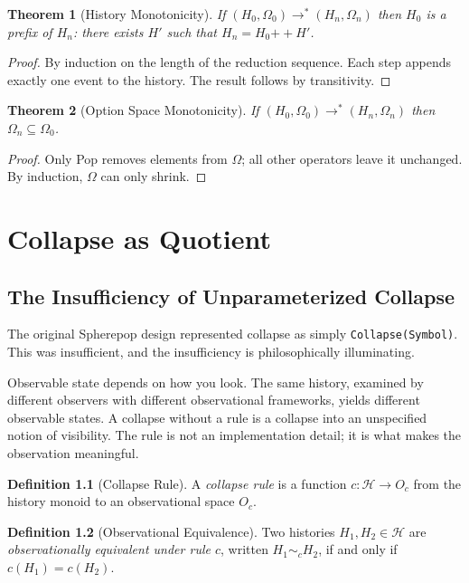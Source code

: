 \documentclass[12pt, a4paper, openany]{book}
\theoremstyle{plain}
\newtheorem{theorem}{Theorem}[chapter]
\theoremstyle{definition}
\newtheorem{definition}[theorem]{Definition}
\theoremstyle{remark}
\newcommand{\calH}{\mathcal{H}}
\begin{document}
\begin{theorem}[History Monotonicity]
If $(H_0, \Omega_0) \to^* (H_n, \Omega_n)$ then $H_0$ is a prefix of $H_n$:
there exists $H'$ such that $H_n = H_0 \mathbin{++} H'$.
\end{theorem}

\begin{proof}
By induction on the length of the reduction sequence. Each step appends exactly
one event to the history. The result follows by transitivity.
\end{proof}

\begin{theorem}[Option Space Monotonicity]
If $(H_0, \Omega_0) \to^* (H_n, \Omega_n)$ then $\Omega_n \subseteq \Omega_0$.
\end{theorem}

\begin{proof}
Only Pop removes elements from $\Omega$; all other operators leave it unchanged.
By induction, $\Omega$ can only shrink.
\end{proof}

\chapter{Collapse as Quotient}

\section{The Insufficiency of Unparameterized Collapse}

The original Spherepop design represented collapse as simply \texttt{Collapse(Symbol)}.
This was insufficient, and the insufficiency is philosophically illuminating.

Observable state depends on how you look. The same history, examined by different
observers with different observational frameworks, yields different observable
states. A collapse without a rule is a collapse into an unspecified notion of
visibility. The rule is not an implementation detail; it is what makes the
observation meaningful.

\begin{definition}[Collapse Rule]
A \emph{collapse rule} is a function $c : \calH \to O_c$ from the history monoid
to an observational space $O_c$.
\end{definition}

\begin{definition}[Observational Equivalence]
Two histories $H_1, H_2 \in \calH$ are \emph{observationally equivalent under
rule $c$}, written $H_1 \sim_c H_2$, if and only if $c(H_1) = c(H_2)$.
\end{definition}
\end{document}
